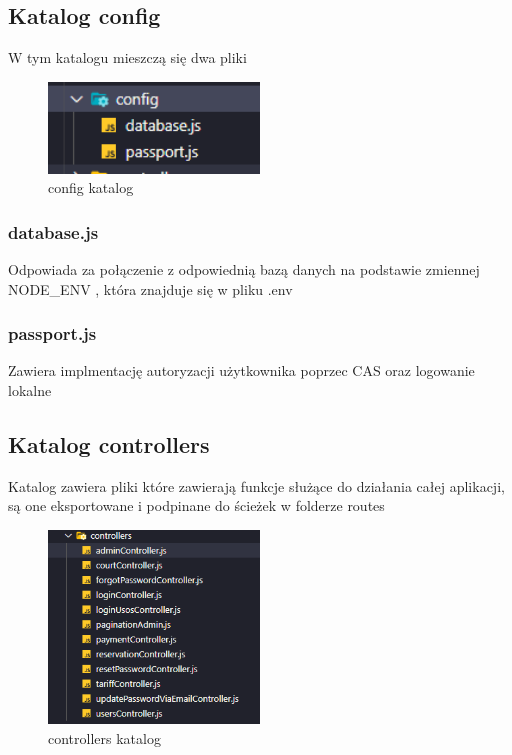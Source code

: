 \documentclass[titlepage]{article}
\begin{document}
\subsection{Katalog config}
W tym katalogu mieszczą się dwa pliki
\begin{figure}[h]
\centering
\includegraphics[width=0.5\textwidth]{config.png}
\caption{config katalog}
\label{fig:obrazek config}
\end{figure}
\subsubsection{database.js}

Odpowiada za połączenie z odpowiednią bazą danych na podstawie zmiennej NODE\_ENV , która znajduje się w pliku .env  
\subsubsection{passport.js}
Zawiera implmentację  autoryzacji użytkownika poprzec CAS oraz logowanie lokalne

\subsection{Katalog controllers}
Katalog zawiera pliki które zawierają funkcje służące do działania całej aplikacji, są one eksportowane i podpinane do ścieżek w folderze routes

\begin{figure}[h]
\centering
\includegraphics[width=0.5\textwidth]{controllers.png}
\caption{controllers katalog}
\label{fig:obrazek controllers}
\end{figure}
\end{document}

